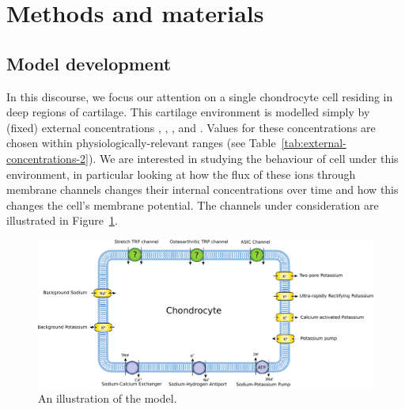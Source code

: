 \section{Methods and materials}
\label{sec:methods-and-materials}


\subsection{Model development}
\label{sec:model-development}

In this discourse, we focus our attention on a single chondrocyte cell
residing in deep regions of cartilage. This cartilage environment is
modelled simply by (fixed) external concentrations \Nao, \Ko, \Cao,
\Ho and \Clo. Values for these concentrations are chosen within
physiologically-relevant ranges (see
Table~\ref{tab:external-concentrations-2}). We are interested in
studying the behaviour of cell under this environment, in particular
looking at how the flux of these ions through membrane channels
changes their internal concentrations over time and how this changes
the cell's membrane potential. The channels under consideration are
illustrated in Figure~\ref{fig:chondrocyte-model}.


\begin{figure}[ht]
  \centering
  \includegraphics[width=\textwidth]
  {../images/pdf/chondrocyte-model-cellml}
  \caption{An illustration of the model.}
  \label{fig:chondrocyte-model}
\end{figure}

